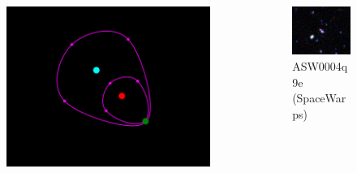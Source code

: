 \documentclass{beamer}
\begin{document}
\begin{frame}
  \begin{columns}[T]
    \begin{column}{5.5cm}
      \begin{figure}
        \includegraphics[width=\textwidth]{imgs/sl-3}
      \end{figure}
    \end{column}
    \begin{column}{5.5cm}
      \begin{figure}
        \includegraphics[width=\textwidth]{imgs/real3-2}
        \caption{ASW0004q9e (SpaceWarps)}
      \end{figure}
    \end{column}
  \end{columns}
\end{frame}
\end{document}
